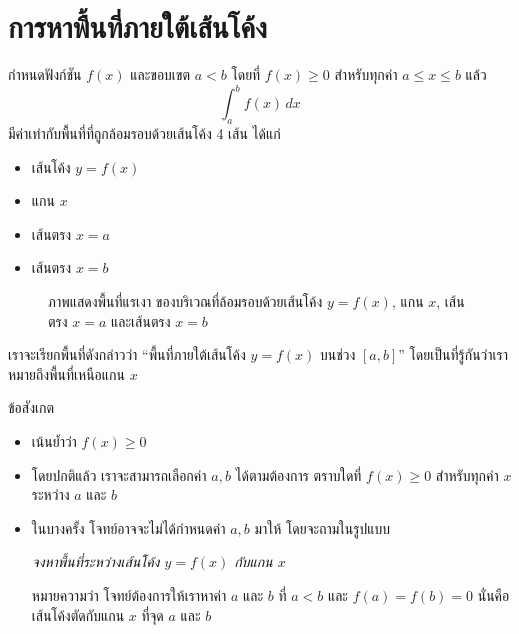 \section{การหาพื้นที่ภายใต้เส้นโค้ง}
\frame{\sectionpage}

\begin{frame}
\begin{thm}{}{}
กำหนดฟังก์ชัน $f(x)$ และขอบเขต $a < b$ โดยที่ $f(x) \geq 0$ สำหรับทุกค่า $a \leq x \leq b$ แล้ว
\[ \int_a^b f(x) \, dx\]
มีค่าเท่ากับพื้นที่ที่ถูกล้อมรอบด้วยเส้นโค้ง 4 เส้น ได้แก่
\begin{itemize}
\item เส้นโค้ง $ y =f(x)$
\item แกน $x$
\item เส้นตรง $x=a$
\item เส้นตรง $x=b$
\end{itemize}
\end{thm}
\end{frame}

\begin{frame}
\begin{figure}[h!]
\centering
{}
\caption{ภาพแสดงพื้นที่แรเงา ของบริเวณที่ล้อมรอบด้วยเส้นโค้ง $y=f(x)$, แกน $x$, เส้นตรง $x=a$ และเส้นตรง $x=b$}
\end{figure}
เราจะเรียกพื้นที่ดังกล่าวว่า ``พื้นที่ภายใต้เส้นโค้ง $y = f(x)$ บนช่วง $[a,b]$'' โดยเป็นที่รู้กันว่าเราหมายถึงพื้นที่เหนือแกน $x$
\end{frame}

\begin{frame}
\begin{remark}{ข้อสังเกต}
\begin{itemize}
\item เน้นย้ำว่า $f(x) \geq 0$ 
\item โดยปกติแล้ว เราจะสามารถเลือกค่า $a,b$ ได้ตามต้องการ ตราบใดที่ $f(x) \geq 0$ สำหรับทุกค่า $x$ ระหว่าง $a$ และ $b$
\item ในบางครั้ง โจทย์อาจจะไม่ได้กำหนดค่า $a,b$ มาให้ โดยจะถามในรูปแบบ
\begin{block}{}
\begin{center}
\textit{จงหาพื้นที่ระหว่างเส้นโค้ง $y = f(x)$ กับแกน $x$}
\end{center}
\end{block}
หมายความว่า โจทย์ต้องการให้เราหาค่า $a$ และ $b$ ที่ $a<b$ และ $f(a)=f(b)=0$ นั่นคือ เส้นโค้งตัดกับแกน $x$ ที่จุด $a$ และ $b$
\end{itemize}
\end{remark}
\end{frame}

